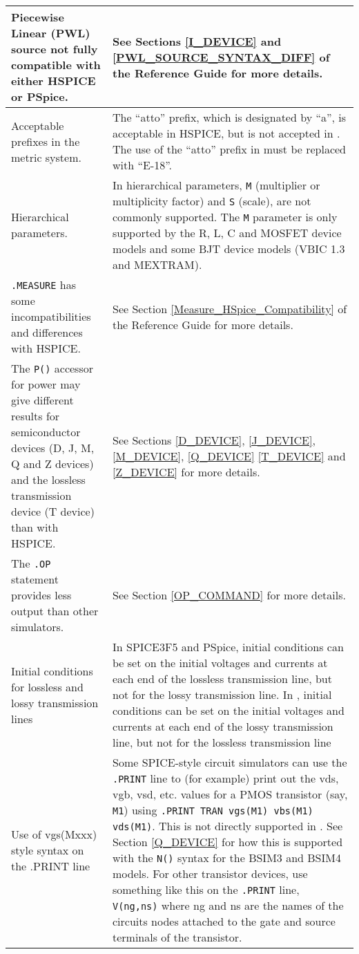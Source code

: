 \begin{longtable}[h] {>{\raggedright\small}m{2in}|>{\raggedright\let\\\tabularnewline\small}m{3.5in}}
    Piecewise Linear (PWL) source not fully compatible with either HSPICE
    or PSpice. & See Sections \ref{I_DEVICE} and \ref{PWL_SOURCE_SYNTAX_DIFF} 
    of the \Xyce{} Reference Guide for more details. \\ \hline

    Acceptable prefixes in the metric system. &
    The ``atto'' prefix, which is designated by ``a'', is acceptable in HSPICE,
    but is not accepted in \Xyce{}. 
    The use of the ``atto'' prefix in \Xyce{} must be replaced with ``E-18''. \\ \hline

    Hierarchical parameters. & In \Xyce{} hierarchical parameters, \texttt{M} (multiplier
    or multiplicity factor) and \texttt{S} (scale), are not commonly supported.  The \texttt{M} 
    parameter is only supported by the R, L, C and MOSFET device models and some BJT 
    device models (VBIC 1.3 and MEXTRAM).\\ \hline

    \texttt{.MEASURE} has some incompatibilities and differences with HSPICE. &
    See Section \ref{Measure_HSpice_Compatibility} of the \Xyce{} Reference Guide 
    for more details. \\ \hline

    The \texttt{P()} accessor for power may give different results for semiconductor devices
    (D, J, M, Q and Z devices) and the lossless transmission device (T device) than with HSPICE.  
    & See Sections \ref{D_DEVICE}, \ref{J_DEVICE}, \ref{M_DEVICE}, \ref{Q_DEVICE} \ref{T_DEVICE}
    and \ref{Z_DEVICE}  for more details. \\ \hline

    The \Xyce{} \texttt{.OP} statement provides less output than other simulators. & See 
    Section \ref{OP_COMMAND} for more details.    \\ \hline

    Initial conditions for lossless and lossy transmission lines & In SPICE3F5 and PSpice, 
    initial conditions can be set on the initial voltages and currents at each end of the 
    lossless transmission line, but not for the lossy transmission line.  In \Xyce{}, 
    initial conditions can be set on the initial voltages and currents at each end of the
    lossy transmission line, but not for the lossless transmission line  \\ \hline

    Use of vgs(Mxxx) style syntax on the .PRINT line & Some SPICE-style circuit simulators 
    can use the \texttt{.PRINT} line to (for example) print out the vds, vgb, vsd, etc. 
    values for a PMOS transistor (say, \texttt{M1}) using \texttt{.PRINT TRAN vgs(M1) 
    vbs(M1) vds(M1)}.  This is not directly supported in \Xyce{}.  See Section \ref{Q_DEVICE}
    for how this is supported with the \texttt{N()} syntax for the BSIM3 and BSIM4 models.  
    For other transistor devices, use something like this on the \Xyce{} \texttt{.PRINT} 
    line, \texttt{V(ng,ns)} where ng and ns are the names of the circuits nodes attached 
    to the gate and source terminals of the transistor. \\ \hline


\end{longtable}
